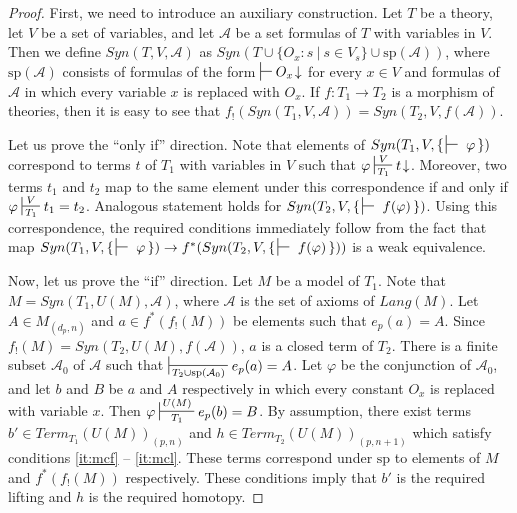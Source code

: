 \documentclass[reqno]{amsart}
\theoremstyle{definition}
\theoremstyle{remark}
\numberwithin{figure}{section}
\begin{document}
\begin{proof}
First, we need to introduce an auxiliary construction.
Let $T$ be a theory, let $V$ be a set of variables, and let $\mathcal{A}$ be a set formulas of $T$ with variables in $V$.
Then we define $Syn(T,V,\mathcal{A})$ as $Syn(T \cup \{ O_x : s\ |\ s \in V_s \} \cup \mathrm{sp}(\mathcal{A}))$,
where $\mathrm{sp}(\mathcal{A})$ consists of formulas of the form $\sststile{}{} O_x\!\downarrow$ for every $x \in V$
and formulas of $\mathcal{A}$ in which every variable $x$ is replaced with $O_x$.
If $f : T_1 \to T_2$ is a morphism of theories, then it is easy to see that $f_!(Syn(T_1,V,\mathcal{A})) = Syn(T_2,V,f(\mathcal{A}))$.

Let us prove the ``only if'' direction.
Note that elements of $Syn(T_1, V, \{\,\sststile{}{}~\varphi\,\})$ correspond to terms $t$ of $T_1$ with variables in $V$ such that $\varphi \sststile{T_1}{V} t\!\downarrow$.
Moreover, two terms $t_1$ and $t_2$ map to the same element under this correspondence if and only if $\varphi \sststile{T_1}{V} t_1 = t_2$.
Analogous statement holds for $Syn(T_2, V, \{\,\sststile{}{}~f(\varphi)\,\})$.
Using this correspondence, the required conditions immediately follow from the fact that
map $Syn(T_1, V, \{\,\sststile{}{}~\varphi\,\}) \to f^*(Syn(T_2, V, \{\,\sststile{}{}~f(\varphi)\,\}))$ is a weak equivalence.

Now, let us prove the ``if'' direction.
Let $M$ be a model of $T_1$.
Note that $M = Syn(T_1, U(M), \mathcal{A})$, where $\mathcal{A}$ is the set of axioms of $Lang(M)$.
Let $A \in M_{(d_p,n)}$ and $a \in f^*(f_!(M))$ be elements such that $e_p(a) = A$.
Since $f_!(M) = Syn(T_2, U(M), f(\mathcal{A}))$, $a$ is a closed term of $T_2$.
There is a finite subset $\mathcal{A}_0$ of $\mathcal{A}$ such that $\sststile{T_2 \cup \mathrm{sp}(\mathcal{A}_0)}{} e_p(a) = A$.
Let $\varphi$ be the conjunction of $\mathcal{A}_0$, and let $b$ and $B$ be $a$ and $A$ respectively in which every constant $O_x$ is replaced with variable $x$.
Then $\varphi \sststile{T_1}{U(M)} e_p(b) = B$.
By assumption, there exist terms $b' \in Term_{T_1}(U(M))_{(p,n)}$ and $h \in Term_{T_2}(U(M))_{(p,n+1)}$ which satisfy conditions \eqref{it:mcf} -- \eqref{it:mcl}.
These terms correspond under $\mathrm{sp}$ to elements of $M$ and $f^*(f_!(M))$ respectively.
These conditions imply that $b'$ is the required lifting and $h$ is the required homotopy.
\end{proof}
\end{document}
